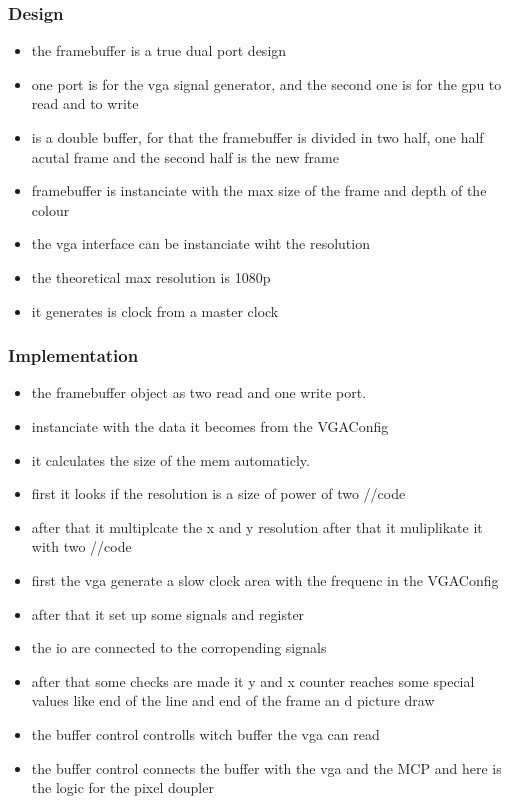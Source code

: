 \subsubsection*{Design}

\begin{itemize}
	\item the framebuffer is a true dual port design
	\item one port is for the vga signal generator, and the second one is for the gpu to read and to write
	\item is a double buffer, for that the framebuffer is divided in two half, one half acutal frame and the second half is the new frame
	\item framebuffer is instanciate with the max size of the frame and depth of the colour  
	\item the vga interface can be instanciate wiht the resolution
	\item the theoretical max resolution is 1080p
	\item it generates is clock from a master clock
\end{itemize}
\subsubsection*{Implementation}
\begin{itemize}
	\item the framebuffer object as two read and one write port. 
	\item instanciate with the data it becomes from the VGAConfig
	\item it calculates the size of the mem automaticly. 
	\item first it looks if the resolution is a size of power of two  //code
	\item after that it multiplcate the x and y resolution after that it muliplikate it with two //code
	\item first the vga generate a slow clock area with the frequenc in the VGAConfig
	\item after that it set up some signals and register
	\item the io are connected to the corropending signals
	\item after that some checks are made it y and x counter reaches some special values like end of the line and end of the frame an d picture draw
	\item the buffer control controlls witch buffer the vga can read
	\item the buffer control connects the buffer with the vga and the MCP and here is the logic for the pixel doupler
\end{itemize}